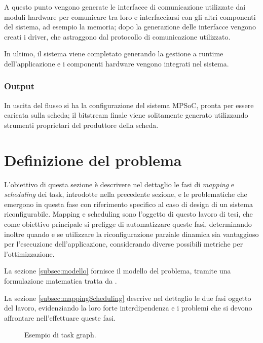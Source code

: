A questo punto vengono generate le interfacce di comunicazione utilizzate dai
moduli hardware per comunicare tra loro e interfacciarsi con gli altri
componenti del sistema, ad esempio la memoria; dopo la generazione delle
interfacce vengono creati i driver, che astraggono dal protocollo di
comunicazione utilizzato.

In ultimo, il sistema viene completato generando la gestione a runtime dell'applicazione e i componenti
hardware vengono integrati nel sistema.

\subsubsection{Output}
In uscita del flusso si ha la configurazione del sistema MPSoC, pronta per essere caricata sulla scheda;
il bitstream finale viene solitamente generato utilizzando strumenti proprietari del produttore della scheda.



\section{Definizione del problema}
\label{sec:definizioneProblema}
L'obiettivo di questa sezione \`e descrivere nel dettaglio le fasi di \emph{mapping} e \emph{scheduling}
dei task, introdotte nella precedente sezione, e le problematiche che emergono in questa fase con riferimento
specifico al caso di design di un sistema riconfigurabile.
Mapping e scheduling sono l'oggetto di questo lavoro di tesi, che come obiettivo principale si prefigge di
automatizzare queste fasi, determinando inoltre quando e se utilizzare la riconfigurazione parziale dinamica
sia vantaggioso per l'esecuzione dell'applicazione, considerando diverse possibili metriche per l'ottimizzazione.

La sezione \ref{subsec:modello} fornisce il modello del problema, tramite una formulazione matematica tratta
da \cite{ModelloRedaelli,ReconfigurableSystemDesignVerification}.

La sezione \ref{subsec:mappingScheduling} descrive nel dettaglio le due fasi oggetto del lavoro, evidenziando
la loro forte interdipendenza e i problemi che si devono affrontare nell'effettuare queste fasi.

\begin{figure}[ht]
\begin{center}
\caption{Esempio di task graph.}
\label{fig:taskGraphExample}
\end{center}
\end{figure}

